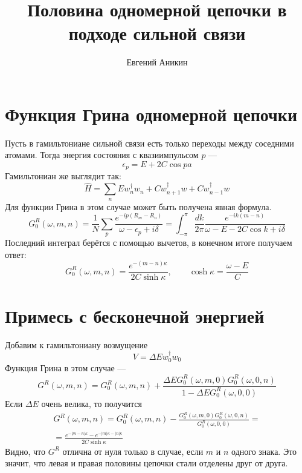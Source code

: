 \documentclass{article}
\title{Половина одномерной цепочки в подходе сильной связи}
\author{Евгений Аникин}
\begin{document}
\maketitle
\section{Функция Грина одномерной цепочки}
Пусть в гамильтониане сильной связи есть только переходы между соседними атомами.
Тогда энергия состояния с квазиимпульсом $p$ --- 
\begin{equation}
	\epsilon_p = E + 2C\cos{pa}
\end{equation}
Гамильтониан же выглядит так:
\begin{equation}
	\hat{H} = \sum_n Ew_n^\dagger w_n + Cw_{n+1}^\dagger w + Cw_{n-1}^\dagger w
\end{equation}
Для функции Грина в этом случае может быть получена явная формула.
\begin{equation}
	G_0^R(\omega, m,n) = 
			\frac{1}{N}\sum_p  \frac{e^{-ip(R_m - R_n)}}{\omega - \epsilon_p + i\delta} = 
			\int_{-\pi}^{\pi} 
				\frac{dk}{2\pi} \frac{e^{-ik(m-n)}}{\omega - E - 2C \cos{k} + i\delta}
\end{equation}
Последний интеграл берётся с помощью вычетов, в конечном итоге получаем ответ:
\begin{equation}
	G_0^R(\omega, m,n) = \frac{e^{-(m-n)\kappa}}{2C\sinh{\kappa}}, \qquad
			\cosh \kappa = \frac{\omega  - E}{C}
\end{equation}
\section{Примесь с бесконечной энергией}
Добавим к гамильтониану возмущение
\begin{equation}
	V = \Delta E w_0^\dagger w_0
\end{equation}
Функция Грина в этом случае ---
\begin{equation}
	G^R(\omega, m,n) = G^R_0(\omega, m,n) + 
		\frac{\Delta EG^R_0(\omega, m,0)G^R_0(\omega, 0, n)}{1 - \Delta E G^R_0(\omega,0,0)}
\end{equation}
Если $\Delta E$ очень велика, то получится
\begin{multline}
	G^R(\omega, m,n) = G^R_0(\omega, m,n) - 
		\frac{G^R_0(\omega, m,0)G^R_0(\omega, 0, n)}{G^R_0(\omega,0,0)} = \\
		= \frac{e^{-|m-n|\kappa} - e^{-|m|\kappa- |n|\kappa}}{2C\sinh \kappa}
\end{multline}
Видно, что $G^R$ отлична от нуля только в случае, если $m$ и $n$ одного знака. Это значит, 
что левая и правая половины цепочки стали отделены друг от друга.
\end{document}
